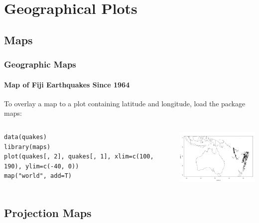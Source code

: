 

\section[Geo]{Geographical Plots}
\subsection{Maps}

\begin{frame}[fragile]
\frametitle{Geographic Maps}
  \framesubtitle{Map of Fiji Earthquakes Since 1964}

To overlay a map to a plot containing latitude and longitude, load the package \ttfamily maps: \normalfont 
    \begin{columns}
\begin{lstlisting}
data(quakes)
library(maps)
plot(quakes[, 2], quakes[, 1], xlim=c(100, 190), ylim=c(-40, 0))
map("world", add=T)
\end{lstlisting}

       \begin{center}
\includegraphics[width = 55mm]{images/Fuji.pdf}
\end{center}
\end{columns}
\end{frame}

\subsection{Projection Maps}

